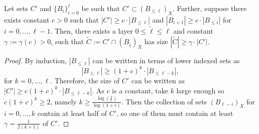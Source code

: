 \begin{lemma} \label{lem:ConstantSizeSwap}
Let sets $C'$ and $\{B_i\}_{i=0}^{\ell}$ be such that $C' \subset (B_{\leq \ell})_X$.
Further, suppose there exists constant $c>0$ 
such that $|C'| \geq c \cdot |B_{\leq \ell}|$
and $|B_{i+1}| \geq c \cdot |B_{\leq i}|$ for $i=0,\ldots,\ell-1$.
Then, there exists a layer $0 \leq\tilde{\ell} \leq \ell$ and constant  $\gamma := \gamma(c) > 0$,
such that $\tilde{C} := C' \cap (B_{\tilde{\ell}})_X$ has size
  $|\tilde{C}| \geq \gamma  \cdot |C'|$.
\end{lemma}
\begin{proof}
By induction, $|B_{\leq \ell}|$ can be written in terms of lower indexed sets as
\[
  |B_{\leq \ell}| \geq (1+c)^k \cdot |B_{\leq \ell-k}|,
\]
for $k=0,\ldots, \ell$. Therefore, the size of $C'$ can be written as $|C'| \geq c (1+c)^k \cdot |B_{\leq \ell-k}|$. As $c$ is a constant, take $k$ large enough so $c (1+c)^k \geq 2$, namely $k \geq \frac{\log(\frac{2}{c})}{\log(1+c)}$. Then the collection of sets $(B_{\ell-i})_X$ for $i=0,\ldots, k$ contain at least half of $C'$, so one of them must contain at least  $\gamma = \frac{1}{2(k+1)}$ of $C'$.
\end{proof}


